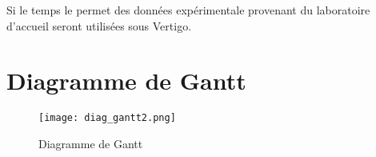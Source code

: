 \documentclass[11pt]{report}
\begin{document}
Si le temps le permet des données expérimentale provenant du laboratoire d'accueil seront utilisées sous Vertigo.



  



\chapter{Diagramme de Gantt} %


\begin{landscape}



 \pagestyle{empty} 

 \begin{figure}[h!]
  \caption{Diagramme de Gantt}
  \hspace{-4.7cm}
    \texttt{[image: diag\_gantt2.png]}
\end{figure}
 

 \end{landscape}

%
\end{document}
